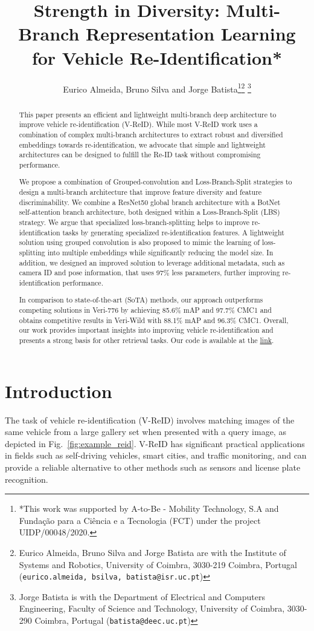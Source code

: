 \documentclass[letterpaper, 10pt, conference]{ieeeconf}
\title{\LARGE \bf Strength in Diversity: Multi-Branch Representation Learning for Vehicle Re-Identification*}
\author{Eurico Almeida, Bruno Silva and Jorge Batista\thanks{*This work was supported by A-to-Be - Mobility Technology, S.A and Fundação para a Ciência e a Tecnologia (FCT) under the project UIDP/00048/2020.}\thanks{Eurico Almeida, Bruno Silva and Jorge Batista are with the Institute of Systems and Robotics,
        University of Coimbra, 3030-219 Coimbra, Portugal
        ({\tt\small eurico.almeida, bsilva, batista@isr.uc.pt})} \thanks{Jorge Batista is with the Department of Electrical and Computers Engineering, Faculty of Science and Technology, University of Coimbra, 3030-290 Coimbra, Portugal
        ({\tt\small batista@deec.uc.pt})}}
\begin{document}
\maketitle
\thispagestyle{empty}
\pagestyle{empty}

\begin{abstract}

This paper presents an efficient and lightweight multi-branch deep architecture to improve vehicle re-identification (V-ReID). While most V-ReID work uses a combination of complex multi-branch architectures to extract robust and diversified embeddings towards re-identification, we advocate that simple and lightweight architectures can be designed to fulfill the Re-ID task without compromising performance.

We propose a combination of Grouped-convolution and Loss-Branch-Split strategies to design a multi-branch architecture that improve feature diversity and feature discriminability. 
We combine a ResNet50 global branch architecture with a BotNet self-attention branch architecture, both designed within a Loss-Branch-Split (LBS) strategy. We argue that specialized loss-branch-splitting helps to improve re-identification tasks by generating specialized re-identification features. A lightweight solution using grouped convolution is also proposed to mimic the learning of loss-splitting into multiple embeddings while significantly reducing the model size.
In addition, we designed an improved solution to leverage additional metadata, such as camera ID and pose information, that uses 97\% less parameters, further improving re-identification performance.

In comparison to state-of-the-art (SoTA) methods, our approach outperforms competing solutions in Veri-776 by achieving 85.6\% mAP and 97.7\% CMC1 and obtains competitive results in Veri-Wild with 88.1\% mAP and 96.3\% CMC1. Overall, our work provides important insights into improving vehicle re-identification and presents a strong basis for other retrieval tasks. Our code is available at the \href{https://github.com/videturfortuna/vehicle_reid_itsc2023}{link}.
\end{abstract}


\section{Introduction}

The task of vehicle re-identification (V-ReID) involves matching images of the same vehicle from a large gallery set when presented with a query image, as depicted in Fig.~\ref{fig:example_reid}. V-ReID has significant practical applications in fields such as self-driving vehicles, smart cities, and traffic monitoring, and can provide a reliable alternative to other methods such as sensors and license plate recognition. 
\end{document}
